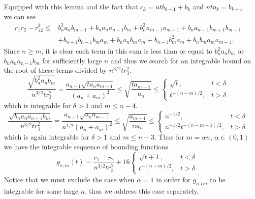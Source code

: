 \documentclass[12pt]{amsart}
\theoremstyle{remark}
\begin{document}
Equipped with this lemma and the fact that $c_k=ntb_{k-1}+b_k$ and $nta_k=b_{k+1}$ we can see
\begin{align*}r_1r_2-r_{12}^2\le &b_n^2a_nb_{m-1}+b_na_na_{n-1}b_m+b_n^2a_{m-1}a_{m-1}+b_na_{n-1}b_{m+1}b_{m-1}
\\&+b_{n+1}b_{n-1}b_ma_m+b_na_nb_ma_m+b_{n-1}b_m^2a_m+b_nb_ma_ma_{m-1}.
\end{align*}
Since $n\ge m$, it is clear each term in this sum is less than or equal to $b_n^2a_nb_{m}$ or $b_na_na_{n-1}b_{m}$ for sufficiently large $n$ and thus we search for an integrable bound on the root of these terms divided by $n^{3/2}tr_3^2$.
\[\frac{\sqrt{b_n^2a_nb_{m}}}{n^{3/2}tr_3^2}=\frac{a_{n-1}\sqrt{ta_na_{m-1}}}{(a_n+a_m)^2}\le\sqrt{\frac{ta_{m-1}}{a_n}}\le\left\{\begin{array}{ll}
\sqrt{t},& t<\delta\\t^{-(n-m)/2},&t>\delta
\end{array}\right.\]which is integrable for $\delta>1$ and $m\le n-4$.
\[\frac{\sqrt{b_na_na_{n-1}b_m}}{n^{3/2}tr_3^2}=\frac{a_{n-1}\sqrt{a_na_{m-1}}}{n^{1/2}(a_n+a_m)^2}\le \sqrt{\frac{a_{m-1}}{na_n}}\le\left\{\begin{array}{ll}
n^{-1/2},& t<\delta\\n^{-1/2}t^{-(n-m+1)/2},&t>\delta
\end{array}\right.\]which is again integrable for $\delta>1$ and $m\le n-3$.
Thus for $m=\alpha n$, $\alpha\in(0,1)$ we have the integrable sequence of bounding functions
\begin{equation}\label{alphanbound}
g_{n,m}(t)=\frac{r_1-r_2}{n^{3/2}tr_3^2}+16\left\{\begin{array}{ll}
\sqrt{t+1},&t<\delta\\t^{-(n-m)/2},&t>\delta
\end{array}\right._.
\end{equation}
Notice that we must exclude the case when $\alpha=1$ in order for $g_{n,\alpha n}$ to be integrable for some large $n$, thus we address this case separately.
\end{document}
